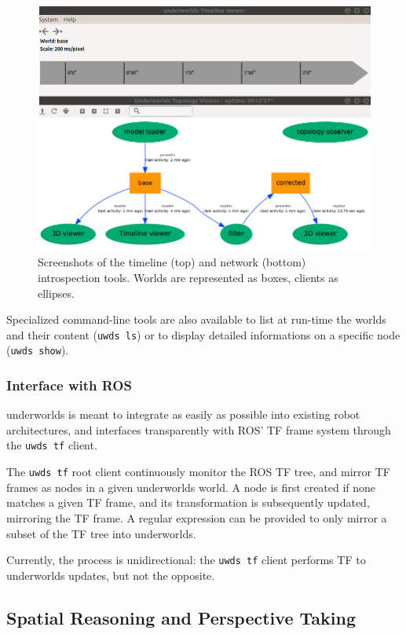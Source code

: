 \documentclass[letterpaper, 10 pt, conference]{ieeeconf}  %
\newcommand{\uwds}{{\sc underworlds}\xspace}
\begin{document}
\begin{figure}
    \centering
    \includegraphics[width=\linewidth]{tools}
    \caption{Screenshots of the timeline (top) and network (bottom)
    introspection tools. Worlds are represented as boxes, clients as ellipses.}
    \label{fig|explorer}
\end{figure}

Specialized command-line tools are also available to list at run-time the worlds
and their content ({\tt uwds ls}) or to display detailed informations on a
specific node ({\tt uwds show}).

\subsubsection{Interface with ROS}

\uwds is meant to integrate as easily as possible into existing robot
architectures, and interfaces transparently with ROS' TF frame system through
the {\tt uwds tf} client.

The {\tt uwds tf} root client continuously monitor the ROS TF tree, and mirror
TF frames as nodes in a given \uwds world. A node is first created if none
matches a given TF frame, and its transformation is subsequently updated,
mirroring the TF frame. A regular expression can be provided to only mirror a
subset of the TF tree into \uwds.

Currently, the process is unidirectional: the {\tt uwds tf} client performs TF
to \uwds updates, but not the opposite.

\subsection{Spatial Reasoning and Perspective Taking}
\end{document}
